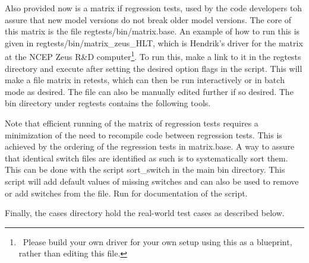 \tnoindent
Also provided now is a matrix if regression tests, used by the code developers
toh assure that new model versions do not break older model versions. The core
of this matrix is the file {\file regtests/bin/matrix.base}. An example of how
to run this is given in {\file regtests/bin/matrix\_zeus\_HLT}, which is
Hendrik's driver for the matrix at the NCEP Zeus R\&D
computer\footnote{~Please build your own driver for your own setup using this
as a blueprint, rather than editing this file.}. To run this, make a link to
it in the {\file regtests} directory and execute after setting the desired
option flags in the script. This will make a file {\file matrix} in {\file
retests}, which can then be run interactively or in batch mode as desired. The
file can also be manually edited further if so desired. The {\file bin}
directory under {\file regtests} contains the following tools.

\begin{flist}
\end{flist}

\noindent 
Note that efficient running of the matrix of regression tests requires a
minimization of the need to recompile code between regression tests. This is
achieved by the ordering of the regression tests in {\file matrix.base}. A way
to assure that identical switch files are identified as such is to
systematically sort them. This can be done with the script {\file
sort\_switch} in the main {\file bin} directory. This script will add default
values of missing switches and can also be used to remove or add switches from
the file. Run  for documentation of the script.

\vspace{\baselineskip} \noindent 
Finally, the {\file cases} directory hold the real-world test cases as
described below.

\begin{flist}
\end{flist}

